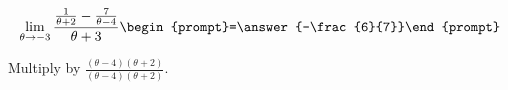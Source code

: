 \documentclass{ximera}
\author{Bart Snapp}
\begin{document}
\begin{exercise}

\[
\lim_{\theta\to -3 } \frac{\frac{1}{\theta +2}-\frac{7}{\theta -4}}{\theta +3}  \begin{prompt}=\answer{-\frac{6}{7}}\end{prompt}
\]
\begin{hint}
Multiply by $\frac{(\theta -4) (\theta +2)}{(\theta -4) (\theta +2)}$.
\end{hint}
\end{exercise}
\end{document}
